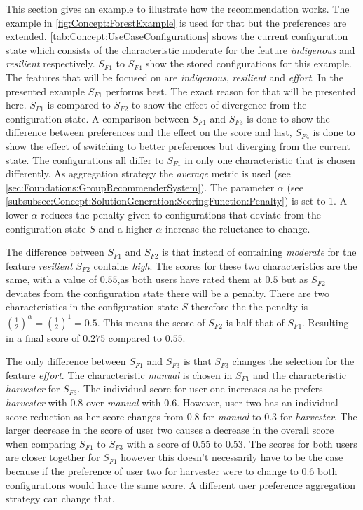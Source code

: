 This section gives an example to illustrate how the recommendation works. The example in \autoref{fig:Concept:ForestExample} is used for that but the preferences are extended. \autoref{tab:Concept:UseCaseConfigurations} shows the current configuration state which consists of the characteristic moderate for the feature \textit{indigenous} and  \textit{resilient} respectively. $S_{F1}$ to $S_{F4}$ show the stored configurations for this example. The features that will be focused on are \textit{indigenous}, \textit{resilient} and \textit{effort}. In the presented example $S_{F1}$ performs best. The exact reason for that will be presented here. $S_{F1}$ is compared to $S_{F2}$ to show the effect of divergence from the configuration state.  A comparison between $S_{F1}$  and $S_{F3}$ is done to show the difference between preferences and the effect on the score and last, $S_{F4}$ is done to show the effect of switching to better preferences but diverging from the current state. The configurations all differ to $S_{F1}$ in only one characteristic that is chosen differently. As aggregation strategy the \emph{average} metric is used (see \autoref{sec:Foundations:GroupRecommenderSystem}). The parameter $\alpha$ (see \autoref{subsubsec:Concept:SolutionGeneration:ScoringFunction:Penalty}) is set to 1. A lower $\alpha$ reduces the penalty given to configurations that deviate from the configuration state $S$ and a higher $\alpha$ increase the reluctance to change.

The difference between  $S_{F1}$ and  $S_{F2}$ is that instead of containing \emph{moderate} for the feature \emph{resilient} $S_{F2}$ contains \emph{high}. The scores for these two characteristics are the same, with a value of $0.55$,as both users have rated them at $0.5$ but as $S_{F2}$ deviates from the configuration state there will be a penalty. There are two characteristics in the configuration state $S$ therefore the the penalty is $(\frac{1}{2})^\alpha = (\frac{1}{2})^1 = 0.5$. This means the score of $S_{F2}$ is half that of $S_{F1}$. Resulting in a final score of $0.275$ compared to $0.55$.

The only difference between $S_{F1}$ and $S_{F3}$ is that $S_{F3}$ changes the selection for the feature \emph{effort}. The characteristic \emph{manual} is chosen in $S_{F1}$ and the characteristic \emph{harvester} for $S_{F3}$. The individual score for user one increases as he prefers \emph{harvester} with $0.8$ over \emph{manual} with $0.6$. However, user two has an individual score reduction as her score changes from $0.8$ for \emph{manual} to $0.3$ for \emph{harvester}. The larger decrease in the score of user two causes a decrease in the overall score when comparing  $S_{F1}$ to $S_{F3}$ with a score of $0.55$ to $0.53$. The scores for both users are closer together for $S_{F1}$ however this doesn't necessarily have to be the case because if the preference of user two for harvester were to change to $0.6$ both configurations would have the same score. A different user preference aggregation strategy can change that.

